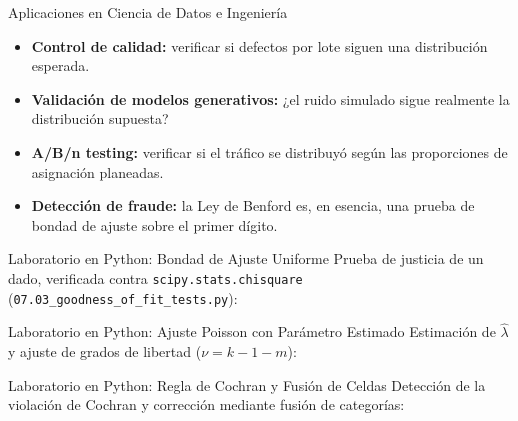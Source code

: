 \documentclass[10pt, aspectratio=169]{beamer}
\begin{document}
\begin{frame}{Aplicaciones en Ciencia de Datos e Ingeniería}
  \footnotesize
  \begin{itemize}\itemsep=0.1cm
    \item \textbf{Control de calidad:} verificar si defectos por lote siguen una distribución esperada. \pause
    \item \textbf{Validación de modelos generativos:} ¿el ruido simulado sigue realmente la distribución supuesta? \pause
    \item \textbf{A/B/n testing:} verificar si el tráfico se distribuyó según las proporciones de asignación planeadas. \pause
    \item \textbf{Detección de fraude:} la Ley de Benford es, en esencia, una prueba de bondad de ajuste sobre el primer dígito.
  \end{itemize}
\end{frame}

\begin{frame}[fragile]{Laboratorio en Python: Bondad de Ajuste Uniforme}
  \scriptsize
  Prueba de justicia de un dado, verificada contra \texttt{scipy.stats.chisquare} (\texttt{07.03\_goodness\_of\_fit\_tests.py}):
  {
  }
\end{frame}

\begin{frame}[fragile]{Laboratorio en Python: Ajuste Poisson con Parámetro Estimado}
  \scriptsize
  Estimación de $\hat\lambda$ y ajuste de grados de libertad ($\nu=k-1-m$):
  {
  }
\end{frame}

\begin{frame}[fragile]{Laboratorio en Python: Regla de Cochran y Fusión de Celdas}
  \scriptsize
  Detección de la violación de Cochran y corrección mediante fusión de categorías:
  {
  }
\end{frame}
\end{document}
